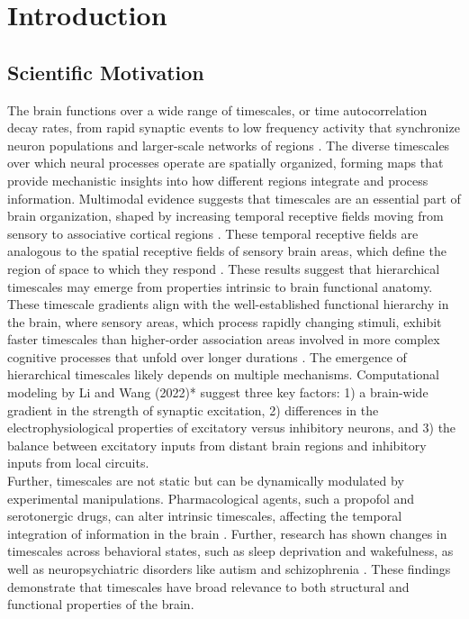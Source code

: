 \documentclass[latex/main.tex]{subfiles}
\begin{document}
\section{Introduction}

\subsection{Scientific Motivation} 
The brain functions over a wide range of timescales, or time autocorrelation decay rates, from rapid synaptic events to low frequency activity that synchronize neuron populations and larger-scale networks of regions \cite{buzsaki_large-scale_2004}. The diverse timescales over which neural processes operate are spatially organized, forming maps that provide mechanistic insights into how different regions integrate and process information. Multimodal evidence suggests that timescales are an essential part of brain organization, shaped by increasing temporal receptive fields moving from sensory to associative cortical regions \cite{raut_hierarchical_2020, gao_neuronal_2020, hasson_hierarchy_2008}. These temporal receptive fields are analogous to the spatial receptive fields of sensory brain areas, which define the region of space to which they respond \cite{hubel_receptive_1959}. These results suggest that hierarchical timescales may emerge from properties intrinsic to brain functional anatomy.\\

These timescale gradients align with the well-established functional hierarchy in the brain, where sensory areas, which process rapidly changing stimuli, exhibit faster timescales than higher-order association areas involved in more complex cognitive processes that unfold over longer durations \cite{murray_hierarchy_2014, hasson_hierarchy_2008, stephens_place_2013}. The emergence of hierarchical timescales likely depends on multiple mechanisms. Computational modeling by Li and Wang (2022)*\cite{li_hierarchical_2022} suggest three key factors: 1) a brain-wide gradient in the strength of synaptic excitation, 2) differences in the electrophysiological properties of excitatory versus inhibitory neurons, and 3) the balance between excitatory inputs from distant brain regions and inhibitory inputs from local circuits.\\

Further, timescales are not static but can be dynamically modulated by experimental manipulations. Pharmacological agents, such a propofol and serotonergic drugs, can alter intrinsic timescales, affecting the temporal integration of information in the brain \cite{huang_timescales_2018, shinn_functional_2023}. Further, research has shown changes in timescales across behavioral states, such as sleep deprivation and wakefulness, as well as neuropsychiatric disorders like autism and schizophrenia \cite{meisel_decline_2017, watanabe_atypical_2019, wengler_distinct_2020}. These findings demonstrate that timescales have broad relevance to both structural and functional properties of the brain.\\
\end{document}
